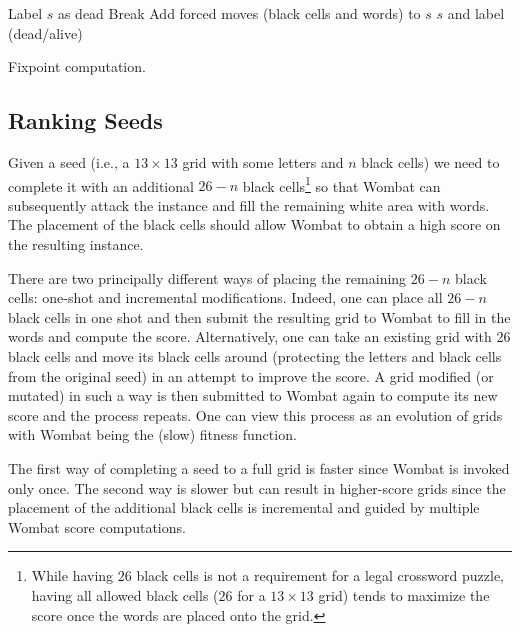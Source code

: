 \begin{algorithm}[t]
\DontPrintSemicolon %
 {
     {
        Label $s$ as dead\;
        Break\;
    }
    Add forced moves (black cells and words) to $s$\;
}
\Return $s$ and label (dead/alive)
\caption{{\sc Fixpoint computation.}}
\label{algo:fixpoint}
\end{algorithm}


\subsection{Ranking Seeds}
\label{sec:ranking}

Given a seed (i.e., a $13 \times 13$ grid with some letters and $n$ black cells) we need to complete it with an additional $26-n$ black cells\footnote{While having $26$ black cells is not a requirement for a legal crossword puzzle, having all allowed black cells ($26$ for a $13 \times 13$ grid) tends to maximize the score once the words are placed onto the grid.} 
so that {\sc Wombat} can 
subsequently attack the instance and fill the remaining white area with words.
The placement of the black cells should allow {\sc Wombat} to obtain a high score on the resulting instance.

There are two principally different ways of placing the remaining $26-n$ black cells: one-shot and incremental modifications. Indeed, one can place all $26-n$ black cells in one shot and then submit the resulting grid to {\sc Wombat} to fill in the words and compute the score. Alternatively, one can take an existing grid with $26$ black cells and move its black cells around (protecting the letters and black cells from the original seed) in an attempt to improve the score. A grid modified (or mutated) in such a way is then submitted to {\sc Wombat} again to compute its new score and the process repeats. One can view this process as an evolution of grids with {\sc Wombat} being the (slow) fitness function.

The first way of completing a seed to a full grid is faster since {\sc Wombat} is invoked only once. The second way is slower but can result in higher-score grids since the placement of the additional black cells is incremental and guided by multiple {\sc Wombat} score computations.

